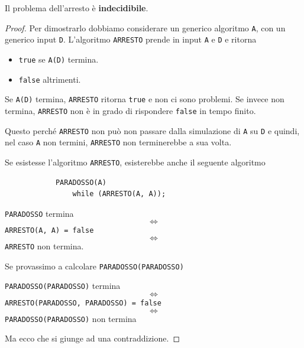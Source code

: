 \begin{theorem}
	Il problema dell'arresto \`e \textbf{indecidibile}.

	\begin{proof}
		Per dimostrarlo dobbiamo considerare un generico algoritmo \verb|A|, con un generico input \verb|D|.
		L'algoritmo \verb|ARRESTO| prende in input \verb|A| e \verb|D| e ritorna
		\begin{itemize}
			\item \verb|true| se \verb|A(D)| termina.
			\item \verb|false| altrimenti.
		\end{itemize}
		Se \verb|A(D)| termina, \verb|ARRESTO| ritorna \verb|true| e non ci sono problemi. Se invece non termina,
		\verb|ARRESTO| non \`e in grado di rispondere \verb|false| in tempo finito.

		Questo perch\'e \verb|ARRESTO| non pu\`o non passare dalla simulazione di \verb|A| su \verb|D| e quindi, nel
		caso \verb|A| non termini, \verb|ARRESTO| non terminerebbe a sua volta.

		Se esistesse l'algoritmo \verb|ARRESTO|, esisterebbe anche il seguente algoritmo
		\begin{lstlisting}
			PARADOSSO(A)
				while (ARRESTO(A, A));
		\end{lstlisting}
		\begin{center}
			\verb|PARADOSSO| termina
			\[ \Leftrightarrow \]
			\verb|ARRESTO(A, A) = false|
			\[ \Leftrightarrow \]
			\verb|ARRESTO| non termina.
		\end{center}

		Se provassimo a calcolare \verb|PARADOSSO(PARADOSSO)|
		\begin{center}
			\verb|PARADOSSO(PARADOSSO)| termina
			\[ \Leftrightarrow \]
			\verb|ARRESTO(PARADOSSO, PARADOSSO) = false|
			\[ \Leftrightarrow \]
			\verb|PARADOSSO(PARADOSSO)| non termina
		\end{center}
		Ma ecco che si giunge ad una contraddizione.
	\end{proof}
\end{theorem}
